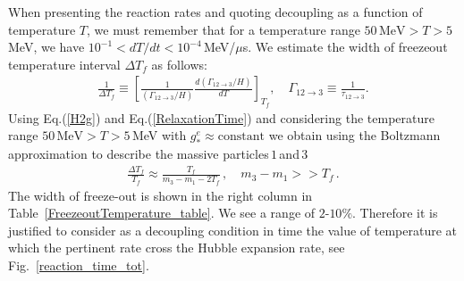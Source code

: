 When presenting the reaction rates and quoting decoupling as a function of temperature $T$, we must remember that for a temperature range $50\,\mathrm{MeV}>T>5$\,MeV, we have $10^{-1}<dT/dt<10^{-4}$\,MeV/$\mu$s. We estimate the width of freezeout temperature interval $\Delta T_f$  as follows:
\begin{align}
\frac{1}{\Delta T_f}\equiv \left[\frac{1}{(\Gamma_{12\to3}/H)}\frac{d(\Gamma_{12\to3}/H)}{dT}\right]_{T_f},\quad \Gamma_{12\to3}\equiv\frac{1}{\tau_{12\to3}}.
\end{align}
Using Eq.(\ref{H2g}) and Eq.(\ref{RelaxationTime}) and considering the temperature range $50\,\mathrm{MeV}>T>5$\,MeV with $g^e_\ast\approx\mathrm{constant}$ we obtain using the Boltzmann approximation to describe the  massive particles\,$1$\,and\,$3$
\begin{align}\label{DeltaFreezeout}
 \frac{\Delta T_f}{ T_f} \approx\frac{T_f  }{ m_3 - m_1 -2T_f}\,,\quad m_3 - m_1>> T_f\,.
\end{align}
The width of freeze-out is shown in the right column in Table~\ref{FreezeoutTemperature_table}. We see a range of $2$-$10\%$. Therefore it is justified to consider as a decoupling condition in time the value of temperature at which the pertinent rate cross the Hubble expansion rate, see Fig.~\ref{reaction_time_tot}.
 
